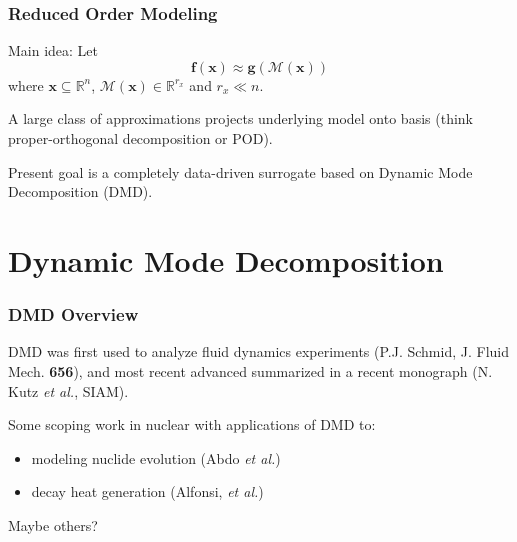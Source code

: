 \documentclass[fleqn]{beamer}
\renewcommand{\vec}[1]{\bm{#1}} %
\begin{document}
\begin{frame}
    
\frametitle{Reduced Order Modeling}

Main idea: Let
\begin{equation*}
 \vec{f}(\vec{x})\approx \vec{g}(\mathcal{M}(\vec{x}))
\end{equation*}
where $\vec{x} \subseteq \mathbb{R}^n$, $\mathcal{M}(\vec{x}) \in \mathbb{R}^{r_x}$ and $r_x \ll n$.

\pause
\vfill

A large class of approximations projects underlying model onto basis (think proper-orthogonal decomposition or POD).

\pause
\vfill 

Present goal is a completely data-driven surrogate based on Dynamic Mode Decomposition (DMD).

\end{frame}


\section{Dynamic Mode Decomposition}

\begin{frame}
\frametitle{DMD Overview}


DMD was first used to analyze fluid dynamics experiments (P.J. Schmid, J. Fluid Mech. {\bf 656}), and most recent advanced summarized in a recent monograph (N. Kutz {\it et al.}, SIAM).

\pause
\vfill

Some scoping work in nuclear with applications of DMD to:
\begin{itemize}
 \item modeling nuclide evolution (Abdo {\it et al.})
 \item decay heat generation (Alfonsi, {\it et al.})
\end{itemize}
Maybe others?

% 

\end{frame}
\end{document}
